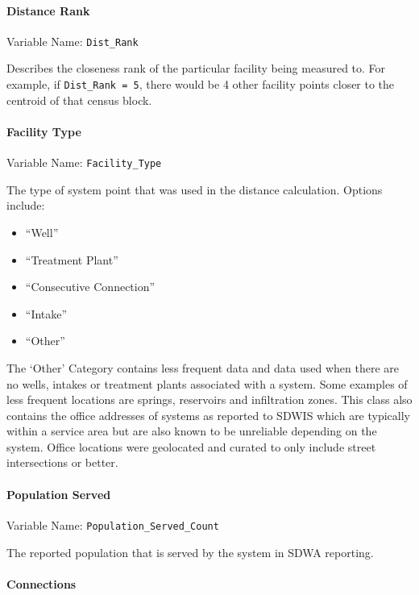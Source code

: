 \documentclass[
  letterpaper,
  DIV=11,
  numbers=noendperiod,
  oneside]{scrartcl}
\let\oldparagraph\paragraph
\renewcommand{\paragraph}[1]{\oldparagraph{#1}\mbox{}}
\providecommand{\tightlist}{%
  \setlength{\itemsep}{0pt}\setlength{\parskip}{0pt}}\usepackage{longtable,booktabs,array}
\begin{document}
\paragraph{Distance Rank}\label{distance-rank}

Variable Name: \texttt{Dist\_Rank}

Describes the closeness rank of the particular facility being measured
to. For example, if \texttt{Dist\_Rank\ =\ 5}, there would be 4 other
facility points closer to the centroid of that census block.

\paragraph{Facility Type}\label{facility-type}

Variable Name: \texttt{Facility\_Type}

The type of system point that was used in the distance calculation.
Options include:

\begin{itemize}
\tightlist
\item
  ``Well''
\item
  ``Treatment Plant''
\item
  ``Consecutive Connection''
\item
  ``Intake''
\item
  ``Other''
\end{itemize}

The `Other' Category contains less frequent data and data used when
there are no wells, intakes or treatment plants associated with a
system. Some examples of less frequent locations are springs, reservoirs
and infiltration zones. This class also contains the office addresses of
systems as reported to SDWIS which are typically within a service area
but are also known to be unreliable depending on the system. Office
locations were geolocated and curated to only include street
intersections or better.

\paragraph{Population Served}\label{population-served}

Variable Name: \texttt{Population\_Served\_Count}

The reported population that is served by the system in SDWA reporting.

\paragraph{Connections}\label{connections}
\end{document}
